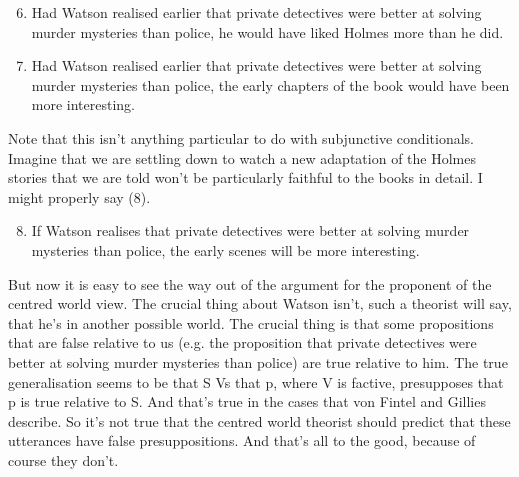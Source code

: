 \begin{enumerate}
\setcounter{enumi}{5}
\item Had Watson realised earlier that private detectives were better at solving murder mysteries than police, he would have liked Holmes more than he did.
\item Had Watson realised earlier that private detectives were better at solving murder mysteries than police, the early chapters of the book would have been more interesting.
\end{enumerate}


{Note that this isn't anything particular to do with subjunctive conditionals. Imagine that we are settling down to watch a new adaptation of the Holmes stories that we are told won't be particularly faithful to the books in detail. I might properly say (8).}

\begin{enumerate}
\setcounter{enumi}{7}
\item {If Watson realises that private detectives were better at solving murder mysteries than police, the early scenes will be more interesting.}
\end{enumerate}


{But now it is easy to see the way out of the argument for the proponent of the centred world view. The crucial thing about Watson isn't, such a theorist will say, that he's in another possible world. The crucial thing is that some propositions that are false relative to us (e.g. the proposition that private detectives were better at solving murder mysteries than police) are true relative to him. The true generalisation seems to be that S Vs that p, where V is factive, presupposes that p is true relative to S. And that's true in the cases that von Fintel and Gillies describe. So it's not true that the centred world theorist should predict that these utterances have false presuppositions. And that's all to the good, because of course they don't.}


